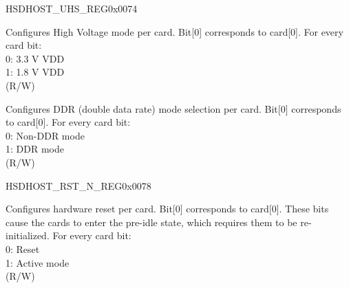\begin{register}{H}{SDHOST\_UHS\_REG}{0x0074}\label{regdesc:SDHOSTUHSREG}
%
%
%
%
\regnewline%
\begin{regdesc}\begin{reglist}
\label{fielddesc:SDHOSTVOLTREG}\item [SDHOST\_VOLT\_REG] Configures High Voltage mode per card. Bit[0] corresponds to card[0]. For every card bit:\\
0: 3.3 V VDD\\
1: 1.8 V VDD\\(R/W)
\label{fielddesc:SDHOSTDDRREG}\item [SDHOST\_DDR\_REG] Configures DDR (double data rate) mode selection per card. Bit[0] corresponds to card[0]. For every card bit:\\
0: Non-DDR mode\\
1: DDR mode\\ (R/W)
\end{reglist}\end{regdesc}
\end{register}


\begin{register}{H}{SDHOST\_RST\_N\_REG}{0x0078}\label{regdesc:SDHOSTRSTNREG}
%
%
\regnewline%
\begin{regdesc}\begin{reglist}
\label{fielddesc:SDHOSTCARDRESET}\item [SDHOST\_CARD\_RESET] Configures hardware reset per card. Bit[0] corresponds to card[0]. These bits cause the cards to enter the pre-idle state, which requires them to be re-initialized. For every card bit:\\
0: Reset\\
1: Active mode\\(R/W)
\end{reglist}\end{regdesc}
\end{register}


